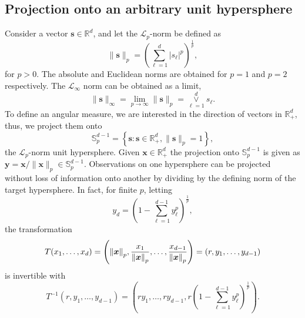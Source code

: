\subsection{Projection onto an arbitrary unit hypersphere\label{subsec:projection}}

Consider a vector $\bm{s} \in {\mathbb R}^d$, and let the $\mathcal{L}_p$-norm be defined as
  \begin{equation*}
    \lVert \bm{s} \rVert_p = \left({\textstyle\sum}_{\ell = 1}^d \lvert s_{\ell}\rvert^p\right)^{\frac{1}{p}},
  \end{equation*}
for $p>0$. The absolute and Euclidean norms are obtained for $p=1$ and $p=2$ respectively. 
The $\mathcal{L}_{\infty}$ norm can be obtained as a limit, 
  \begin{equation*}
    \lVert \bm{s} \rVert_{\infty}
      = \lim\limits_{p\to\infty} \lVert \bm{s} \rVert_p
      = \underset{\ell = 1}{\overset{d}{\vee}}s_{\ell}.
  \end{equation*}
To define an angular measure,  we are interested in the direction of
vectors in ${\mathbb R}_{+}^d$, thus, we project them onto
  \begin{equation*}
    {\mathbb S}_{p}^{d-1} = \left\lbrace \bm{s} : \bm{s} \in {\mathbb R}_{+}^{d}, \lVert \bm{s}\rVert_{p} = 1\right\rbrace,
  \end{equation*}
  the $\mathcal{L}_p$-norm unit hypersphere.
  Given $\bm{x}\in {\mathbb R}^d_+$ the projection onto ${\mathbb S}_{p}^{d-1}$ is given as
  $\bm{y} = \bm{x} / \lVert \bm{x}\rVert_p \in {\mathbb S}_{p}^{d-1}$.
  Observations on one hypersphere can be projected without loss of information onto another by
  dividing by the defining norm of the target hypersphere. In fact, for finite $p$, letting 
  \begin{equation*}
    y_d = \left(1 - {\textstyle\sum}_{\ell = 1}^{d-1}y_{\ell}^p\right)^{\frac{1}{p}},
  \end{equation*}
  the transformation
  \begin{equation}
    \label{eqn:pnormt}
    T(x_1,\ldots,x_d) = \left(\pnorm{\bm{x}}{p}, \frac{x_1}{\pnorm{\bm{x}}{p}},
                          \ldots , \frac{x_{d-1}}{\pnorm{\bm{x}}{p}}\right) = (r,y_1,\ldots,y_{d-1})
  \end{equation}
  is invertible with
  \begin{equation}
    \label{eqn:pnormtinv}
    T^{-1}\left(r,y_1,\ldots,y_{d-1}\right) =
      \left(ry_1,\ldots,ry_{d-1}, r\left(1 - {\textstyle\sum}_{\ell = 1}^{d-1}y_{\ell}^p\right)^{\frac{1}{p}}\right).
  \end{equation}
